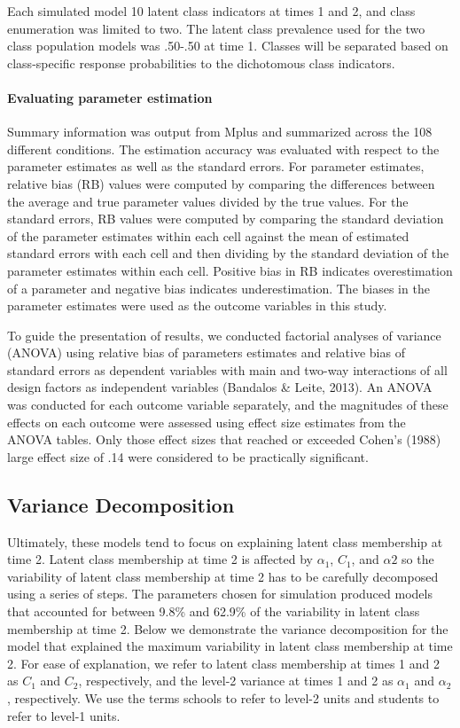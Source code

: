 \documentclass[man]{apa6}
\begin{document}
Each simulated model 10 latent class indicators at times 1 and 2, and class enumeration was limited to two. The latent class prevalence used for the two class population models was .50-.50 at time 1. Classes will be separated based on class-specific response probabilities to the dichotomous class indicators. 


\paragraph*{Evaluating parameter estimation}
Summary information was output from Mplus and summarized across the 108 different conditions. The estimation accuracy was evaluated with respect to the parameter estimates as well as the standard errors. For parameter estimates, relative bias (RB) values were computed by comparing the differences between the average and true parameter values divided by the true values. For the standard errors, RB values were computed by comparing the standard deviation of the parameter estimates within each cell against the mean of estimated standard errors with each cell and then dividing by the standard deviation of the parameter estimates within each cell. Positive bias in RB indicates overestimation of a parameter and negative bias indicates underestimation. The biases in the parameter estimates were used as the outcome variables in this study.  

To guide the presentation of results, we conducted factorial analyses of variance (ANOVA) using relative bias of parameters estimates and relative bias of standard errors as dependent variables with main and two-way interactions of all design factors as independent variables (Bandalos \& Leite, 2013). An ANOVA was conducted for each outcome variable separately, and the magnitudes of these effects on each outcome were assessed using effect size estimates from the ANOVA tables.  Only those effect sizes that reached or exceeded Cohen's (1988) large effect size of .14 were considered to be practically significant.


\subsection*{Variance Decomposition}
Ultimately, these models tend to focus on explaining latent class membership at time 2. Latent class membership at time 2 is affected by $\alpha_1$, $C_1$, and $\alpha2$ so the variability of latent class membership at time 2 has to be carefully decomposed using a series of steps. The parameters chosen for simulation produced models that accounted for between 9.8\% and 62.9\% of the variability in latent class membership at time 2. Below we demonstrate the variance decomposition for the model that explained the maximum variability in latent class membership at time 2. For ease of explanation, we refer to latent class membership at times 1 and 2 as $C_1$ and $C_2$, respectively, and  the level-2 variance at times 1 and 2 as $\alpha_1$ and $\alpha_2$, respectively. We use the terms schools to refer to level-2 units and students to refer to level-1 units.
\end{document}

